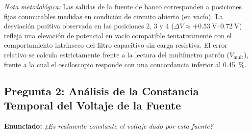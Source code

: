 \begin{appendices}
\begin{table}[H]
    \centering
    \caption{Contraste metrológico de tensiones continuas entre el osciloscopio y el multímetro patrón.}
    \label{tab:anexo_tabla_tres_col}
\end{table}

\textit{Nota metodológica:} Las salidas de la fuente de banco corresponden a posiciones fijas conmutables medidas en condición de circuito abierto (en vacío). La desviación positiva observada en las posiciones 2, 3 y 4 ($\Delta V \approx +\qtyrange{0,53}{0,72}{\volt}$) refleja una elevación de potencial en vacío compatible tentativamente con el comportamiento intrínseco del filtro capacitivo sin carga resistiva. El error relativo se calcula estrictamente frente a la lectura del multímetro patrón ($V_{\text{mult}}$), frente a la cual el osciloscopio responde con una concordancia inferior al \qty{0,45}{\percent}.

\subsection{Pregunta 2: Análisis de la Constancia Temporal del Voltaje de la Fuente}
\textbf{Enunciado:} \textit{¿Es realmente constante el voltaje dado por esta fuente?}


\end{appendices}

